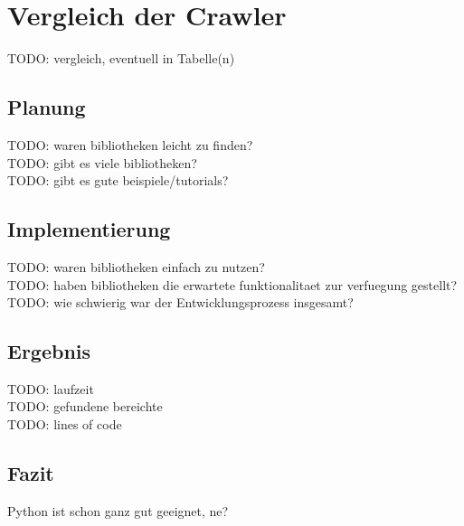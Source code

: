 \chapter{Vergleich der Crawler}
TODO: vergleich, eventuell in Tabelle(n)\\

\section{Planung}
TODO: waren bibliotheken leicht zu finden?\\
TODO: gibt es viele bibliotheken?\\
TODO: gibt es gute beispiele/tutorials?\\

\section{Implementierung}
TODO: waren bibliotheken einfach zu nutzen?\\
TODO: haben bibliotheken die erwartete funktionalitaet zur verfuegung gestellt?\\
TODO: wie schwierig war der Entwicklungsprozess insgesamt?\\

\section{Ergebnis}
TODO: laufzeit\\
TODO: gefundene bereichte\\
TODO: lines of code\\

\section{Fazit}
Python ist schon ganz gut geeignet, ne?\\